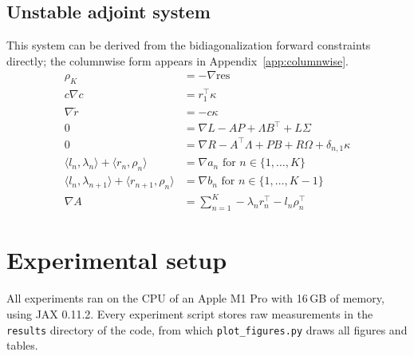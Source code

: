 \documentclass[a4paper,12pt]{article}
\theoremstyle{definition}
\begin{document}
\subsection{Unstable adjoint system}
This system can be derived from the bidiagonalization forward constraints directly; the columnwise form appears in Appendix~\ref{app:columnwise}.
\begin{align}
\rho_K &= - \nabla \text{res}
\\
c \nabla c &= r_1^\top\kappa
\\
\nabla \tilde r &= -c\kappa 
\\
0 &= \nabla L - AP + \Lambda B^\top + L\Sigma
\\
0 &= \nabla R - A^\top\Lambda + PB + R\Omega + \delta_{n,1} \kappa
\\
\langle l_n, \lambda_n \rangle + \langle r_n, \rho_n\rangle &= \nabla a_n \text{ for } n \in \{1, \dots, K\}
\\
\langle l_n, \lambda_{n+1} \rangle + \langle r_{n+1}, \rho_{n}\rangle &= \nabla b_n \text{ for } n \in \{1, \dots, K-1\}
\\
\nabla A &= \sum_{n=1}^K -\lambda_n r_n^\top -l_n\rho_n^\top
\end{align}

\section{Experimental setup}\label{app:setup}
All experiments ran on the CPU of an Apple M1 Pro with 16\,GB of memory, using JAX 0.11.2. Every experiment script stores raw measurements in the \texttt{results} directory of the code, from which \texttt{plot\_figures.py} draws all figures and tables.
\end{document}
